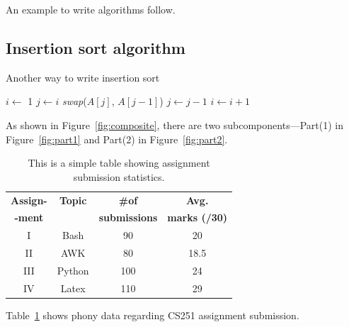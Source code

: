 An example to write algorithms follow.
\subsection{Insertion sort algorithm}

\begin{algorithm}
  \caption{Another way to write insertion sort}
  \label{algo:ins_sort1}
  \begin{algorithmic}[1]
     \newline
      \State $i \leftarrow$ 1
          \State $j \leftarrow i$ \newline
            \State \textit{swap}($A[j]$, $A[j-1]$)
            \State $j \leftarrow j -1$ 
         \EndWhile
      \State $i \leftarrow i + 1$
      \EndWhile
     \EndProcedure 
  \end{algorithmic}
\end{algorithm}



\lipsum[50]

\lipsum[50]

As shown in Figure~\ref{fig:composite}, there are two subcomponents---Part(1) in Figure~\ref{fig:part1}
and Part(2) in Figure~\ref{fig:part2}.


\begin{table}[t]
\scriptsize
\begin{center}
\begin{tabular}{|c|c|c|c|}
\hline
{\bf Assign-} & {\bf Topic} & {\bf \#of} & {\bf Avg.} \\
{\bf -ment} & & {\bf submissions} & {\bf marks (/30)} \\
\hline
\hline
I & Bash & 90 & 20 \\
II & AWK &  80 & 18.5 \\
III & Python & 100 & 24 \\
IV & Latex & 110 & 29 \\
\hline
\end{tabular}
\caption{This is a simple table showing assignment submission statistics.}
\label{table:simple}
\end{center}
\end{table}

Table~\ref{table:simple} shows phony data regarding CS251 assignment submission.
\lipsum[50]

